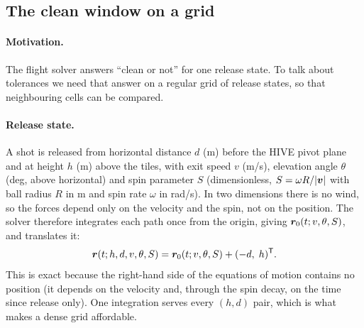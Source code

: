 \subsection{The clean window on a grid}
\label{sec:robust_spec-grid}

\paragraph{Motivation.}
The flight solver answers ``clean or not'' for one release state.
To talk about tolerances we need that answer on a regular grid of release states, so that
neighbouring cells can be compared.

\paragraph{Release state.}
A shot is released from horizontal distance $d$ (\unit{m}) before the HIVE pivot plane and at
height $h$ (\unit{m}) above the tiles, with exit speed $v$ (\unit{m/s}), elevation angle
$\theta$ (\unit{deg}, above horizontal) and spin parameter $S$ (dimensionless, $S=\omega R/|\bm{v}|$
with ball radius $R$ in \unit{m} and spin rate $\omega$ in \unit{rad/s}).
In two dimensions there is no wind, so the forces depend only on the velocity and the spin, not on
the position.
The solver  therefore integrates each path once from the origin, giving
$\bm{r}_0(t;v,\theta,S)$, and translates it:
\begin{equation}
  \bm{r}(t;h,d,v,\theta,S) = \bm{r}_0(t;v,\theta,S) + (-d,\; h)^{\mathsf T}.
  \label{eq:robust_spec-translate}
\end{equation}
This is exact because the right-hand side of the equations of motion contains no position
(it depends on the velocity and, through the spin decay, on the time since release only).
One integration serves every $(h,d)$ pair, which is what makes a dense grid affordable.

